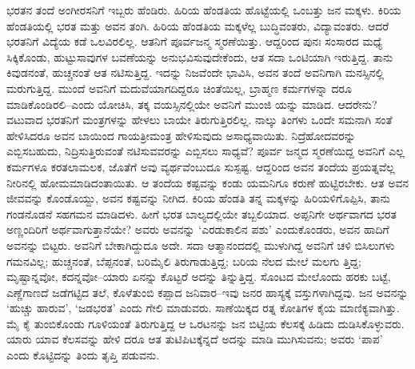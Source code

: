 ಭರತನ ತಂದೆ ಅಂಗೀರಸನಿಗೆ ಇಬ್ಬರು ಹೆಂಡಿರು. ಹಿರಿಯ ಹೆಂಡತಿಯ ಹೊಟ್ಟೆಯಲ್ಲಿ ಒಂಬತ್ತು ಜನ ಮಕ್ಕಳು. ಕಿರಿಯ ಹೆಂಡತಿಯಲ್ಲಿ ಭರತ ಮತ್ತು ಅವನ ತಂಗಿ. ಹಿರಿಯ ಹೆಂಡತಿಯ ಮಕ್ಕಳೆಲ್ಲ ಬುದ್ಧಿವಂತರು, ವಿದ್ಯಾವಂತರು. ಆದರೆ ಭರತನಿಗೆ ವಿದ್ಯೆಯ ಕಡೆ ಒಲವಿರಲಿಲ್ಲ. ಆತನಿಗೆ ಪೂರ್ವಜನ್ಮ ಸ್ಮರಣೆಯಿತ್ತು. ಆದ್ದರಿಂದ ಪುನಃ ಸಂಸಾರದ ಮಧ್ಯೆ ಸಿಕ್ಕಿಕೊಂಡು, ಹುಟ್ಟುಸಾವುಗಳ ಬವಣೆಯನ್ನು ಅನುಭವಿಸುವುದೇಕೆಂದು, ಆತ ಸದಾ ಒಂಟಿಯಾಗಿ ಇರುತ್ತಿದ್ದ. ತಾನು ಕಿವುಡನಂತೆ, ಹುಚ್ಚನಂತೆ ಆತ ನಟಿಸುತ್ತಿದ್ದ. ಇದನ್ನು ನಿಜವೆಂದೇ ಭಾವಿಸಿ, ಅವನ ತಂದೆ ಅವನಿಗಾಗಿ ಮನಸ್ಸಿನಲ್ಲಿ ಮರುಗುತ್ತಿದ್ದ. ಮುಂದೆ ಅವನಿಗೆ ಮದುವೆಯಾಗದಿದ್ದರೂ ಚಿಂತೆಯಿಲ್ಲ, ಬ್ರಾಹ್ಮಣ ಕರ್ಮಗಳನ್ನಾ ದರೂ ಮಾಡಿಕೊಂಡಿರಲಿ–ಎಂದು ಯೋಚಿಸಿ, ತಕ್ಕ ವಯಸ್ಸಿನಲ್ಲಿಯೇ ಅವನಿಗೆ ಮುಂಜಿ ಯನ್ನು ಮಾಡಿದ. ಆದರೇನು? ವಟುವಾದ ಭರತನಿಗೆ ಮಂತ್ರಗಳನ್ನು ಹೇಳಲು ಬಾಯೇ ತಿರುಗುತ್ತಿರಲಿಲ್ಲ. ನಾಲ್ಕು ತಿಂಗಳು ಒಂದೇ ಸಮನಾಗಿ ಸಂತೆ ಹೇಳಿಸಿದರೂ ಅವನ ಬಾಯಿಂದ ಗಾಯತ್ರೀಮಂತ್ರ ಹೇಳಿಸುವುದು ಅಸಾಧ್ಯವಾಯಿತು. ನಿದ್ರೆಹೋದವರನ್ನು ಎಬ್ಬಿಸಬಹುದು, ನಿದ್ರಿಸುತ್ತಿರುವಂತೆ ನಟಿಸುವವರನ್ನು ಎಬ್ಬಿಸಲು ಸಾಧ್ಯವೆ? ಪೂರ್ವ ಜನ್ಮದ ಸ್ಮರಣೆಯಿದ್ದ ಅವನಿಗೆ ಎಲ್ಲ ಕರ್ಮಗಳೂ ಕರತಲಾಮಲಕ, ಜೊತೆಗೆ ಅವು ವ್ಯರ್ಥವೆಂಬುದೂ ಸುಸ್ಪಷ್ಟ. ಆದ್ದರಿಂದ ಅವನ ತಂದೆಯ ಪ್ರಯತ್ನವೆಲ್ಲ ನೀರಿನಲ್ಲಿ ಹೋಮಮಾಡಿದಂತಾಯಿತು. ಆ ತಂದೆಯ ಕಷ್ಟವನ್ನು ಕಂಡು ಯಮನಿಗೂ ಕರುಣೆ ಹುಟ್ಟಿರಬೇಕು. ಆತ ಅವನ ಜೀವವನ್ನು ಕೊಂಡೊಯ್ದು, ಅವನ ಕಷ್ಟವನ್ನು ನೀಗಿದ. ಕಿರಿಯ ಹೆಂಡತಿ ತನ್ನ ಮಕ್ಕಳನ್ನು ಹಿರಿಯಳಿಗೊಪ್ಪಿಸಿ, ತಾನು ಗಂಡನೊಡನೆ ಸಹಗಮನ ಮಾಡಿದಳು. ಹೀಗೆ ಭರತ ಬಾಲ್ಯದಲ್ಲಿಯೇ ತಬ್ಬಲಿಯಾದ. ಅಪ್ಪನಿಗೇ ಅರ್ಥವಾಗದ ಭರತ ಅಣ್ಣಂದಿರಿಗೆ ಅರ್ಥವಾಗುತ್ತಾನೆಯೇ? ಅವರು ಅವನನ್ನು ‘ಎರಡುಕಾಲಿನ ಪಶು’ ಎಂದುಕೊಂಡರು, ಅವನ ಹಾದಿಗೆ ಅವನನ್ನು ಬಿಟ್ಟರು. ಅವನಿಗೆ ಬೇಕಾಗಿದ್ದುದೂ ಅದೇ. ಸದಾ ಆತ್ಮಾನಂದದಲ್ಲಿ ಮುಳುಗಿದ್ದ ಅವನಿಗೆ ಚಳಿ ಬಿಸಿಲುಗಳು ಗಮನವಿಲ್ಲ; ಹುಚ್ಚನಂತೆ, ಬೆಪ್ಪನಂತೆ, ಬರಿಮೈಲಿ ತಿರುಗಾಡುತ್ತಿದ್ದ; ಬರಿಯ ನೆಲದ ಮೇಲೆ ಮಲಗು ತ್ತಿದ್ದ; ಮೃಷ್ಟಾನ್ನವೋ, ಕದನ್ನವೋ–ಯಾರು ಏನನ್ನು ಕೊಟ್ಟರೆ ಅದನ್ನು ತಿನ್ನುತ್ತಿದ್ದ. ಸೊಂಟದ ಮೇಲೊಂದು ಹರಕು ಬಟ್ಟೆ, ಎಣ್ಣೆಗಾಣದೆ ಜಡೆಗಟ್ಟಿದ ತಲೆ, ಕೊಳೆತುಂಬಿ ಕಪ್ಪಾದ ಜನಿವಾರ–ಇವು ಜನರ ಹಾಸ್ಯಕ್ಕೆ ವಸ್ತುಗಳಾಗಿದ್ದವು. ಜನ ಅವನನ್ನು ‘ಹುಚ್ಚು ಹಾರುವ’, ‘ಜಡಭರತ’ ಎಂದು ಗೇಲಿ ಮಾಡುವರು. ಸಾಣೆಯಿಕ್ಕದ ರತ್ನ ಕೋತಿಗಳ ಕೈಯ ಮಾಣಿಕ್ಯವಾಗಿತ್ತು. ಮೈ ಕೈ ತುಂಬಿಕೊಂಡು ಗೂಳಿಯಂತೆ ತಿರುಗುತ್ತಿದ್ದ ಆ ಒರಟನನ್ನು ಜನ ಬಿಟ್ಟಿಯ ಕೆಲಸಕ್ಕೆ ಹಿಡಿದು ದುಡಿಸಿಕೊಳ್ಳುವರು. ಯಾರು ಯಾವ ಕೆಲಸವನ್ನು ಹೇಳಿ ದರೂ ಆತ ತುಟಿಪಿಟಕ್ಕೆನ್ನದೆ ಅದನ್ನು ಮಾಡಿ ಮುಗಿಸುವನು; ಅವರು ‘ಪಾಪ’ ಎಂದು ಕೊಟ್ಟಿದನ್ನು ತಿಂದು ತೃಪ್ತಿ ಪಡುವನು.


